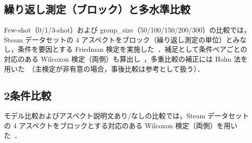 \subsection{繰り返し測定（ブロック）と多水準比較}
Few-shot（0/1/3-shot）および group\_size（50/100/150/200/300）の比較では，Steam データセットの 4 アスペクトをブロック（繰り返し測定の単位）とみなし，条件を要因とする Friedman 検定を実施した~\cite{friedman1937use,demsar2006statistical}．補足として条件ペアごとの対応のある Wilcoxon 検定（両側）も算出し~\cite{wilcoxon1945individual}，多重比較の補正には Holm 法を用いた~\cite{holm1979simple}（主検定が非有意の場合，事後比較は参考として扱う）．

\subsection{2条件比較}
モデル比較およびアスペクト説明文あり/なしの比較では，Steam データセットの 4 アスペクトをブロックとする対応のある Wilcoxon 検定（両側）を用いた~\cite{wilcoxon1945individual}．
